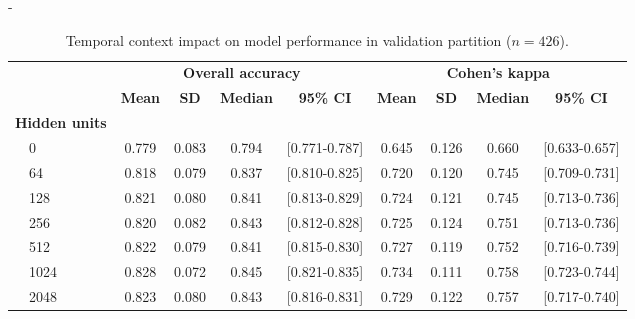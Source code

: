 \begin{table}[t]
\begin{adjustwidth*}{}{-\marginparsep}
\begin{threeparttable}
\small
\caption[\acs{MASSC}v2 temporal context]{Temporal context impact on model performance in validation partition (\(n=426\)).}
\label{tab:sleep-stages:paper-ii:table-s01}
\begin{tabular}{@{}lcccccccc@{}}
\toprule
                         & \multicolumn{4}{c}{\textbf{Overall accuracy}}                         & \multicolumn{4}{c}{\textbf{Cohen’s kappa}}                            \\ \cline{2-9}
                         & \textbf{Mean} & \textbf{SD} & \textbf{Median} & \textbf{95\% CI} & \textbf{Mean} & \textbf{SD} & \textbf{Median} & \textbf{95\% CI} \\ \midrule
\textbf{Hidden units}    &               &             &                 &                       &               &             &                 &                       \\
\(\quad\)0                        & 0.779         & 0.083       & 0.794           & [0.771-0.787]         & 0.645         & 0.126       & 0.660           & [0.633-0.657]         \\
\(\quad\)64                       & 0.818         & 0.079       & 0.837           & [0.810-0.825]         & 0.720         & 0.120       & 0.745           & [0.709-0.731]         \\
\(\quad\)128                      & 0.821         & 0.080       & 0.841           & [0.813-0.829]         & 0.724         & 0.121       & 0.745           & [0.713-0.736]         \\
\(\quad\)256                      & 0.820         & 0.082       & 0.843           & [0.812-0.828]         & 0.725         & 0.124       & 0.751           & [0.713-0.736]         \\
\(\quad\)512                      & 0.822         & 0.079       & 0.841           & [0.815-0.830]         & 0.727         & 0.119       & 0.752           & [0.716-0.739]         \\
\(\quad\)1024                     & 0.828         & 0.072       & 0.845           & [0.821-0.835]         & 0.734         & 0.111       & 0.758           & [0.723-0.744]         \\
\(\quad\)2048                     & 0.823         & 0.080       & 0.843           & [0.816-0.831]         & 0.729         & 0.122       & 0.757           & [0.717-0.740]         \\

\end{tabular}
\end{threeparttable}
\end{adjustwidth*}
\end{table}
